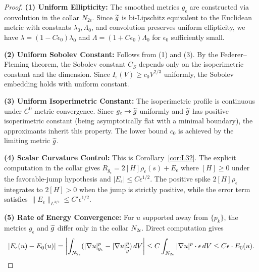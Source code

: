 \begin{proof}
\textbf{(1) Uniform Ellipticity:} The smoothed metrics $g_\epsilon$ are constructed via convolution in the collar $N_{2\epsilon}$. Since $\widetilde{g}$ is bi-Lipschitz equivalent to the Euclidean metric with constants $\lambda_0, \Lambda_0$, and convolution preserves uniform ellipticity, we have $\lambda = (1 - C\epsilon_0)\lambda_0$ and $\Lambda = (1 + C\epsilon_0)\Lambda_0$ for $\epsilon_0$ sufficiently small.

\textbf{(2) Uniform Sobolev Constant:} Follows from (1) and (3). By the Federer--Fleming theorem, the Sobolev constant $C_S$ depends only on the isoperimetric constant and the dimension. Since $I_\epsilon(V) \ge c_0 V^{2/3}$ uniformly, the Sobolev embedding holds with uniform constant.

\textbf{(3) Uniform Isoperimetric Constant:} The isoperimetric profile is continuous under $C^0$ metric convergence. Since $g_\epsilon \to \widetilde{g}$ uniformly and $\widetilde{g}$ has positive isoperimetric constant (being asymptotically flat with a minimal boundary), the approximants inherit this property. The lower bound $c_0$ is achieved by the limiting metric $\widetilde{g}$.

\textbf{(4) Scalar Curvature Control:} This is Corollary~\ref{cor:L32}. The explicit computation in the collar gives $R_{g_\epsilon} = 2[H]\rho_\epsilon(s) + E_\epsilon$ where $[H] \ge 0$ under the favorable-jump hypothesis and $|E_\epsilon| \le C\epsilon^{1/2}$. The positive spike $2[H]\rho_\epsilon$ integrates to $2[H] > 0$ when the jump is strictly positive, while the error term satisfies $\|E_\epsilon\|_{L^{3/2}} \le C'\epsilon^{1/2}$.

\textbf{(5) Rate of Energy Convergence:} For $u$ supported away from $\{p_k\}$, the metrics $g_\epsilon$ and $\widetilde{g}$ differ only in the collar $N_{2\epsilon}$. Direct computation gives
\[
|E_\epsilon(u) - E_0(u)| = \left| \int_{N_{2\epsilon}} (|\nabla u|_{g_\epsilon}^p - |\nabla u|_{\widetilde{g}}^p) \, dV \right| \le C \int_{N_{2\epsilon}} |\nabla u|^p \cdot \epsilon \, dV \le C\epsilon \cdot E_0(u).
\]
\end{proof}

